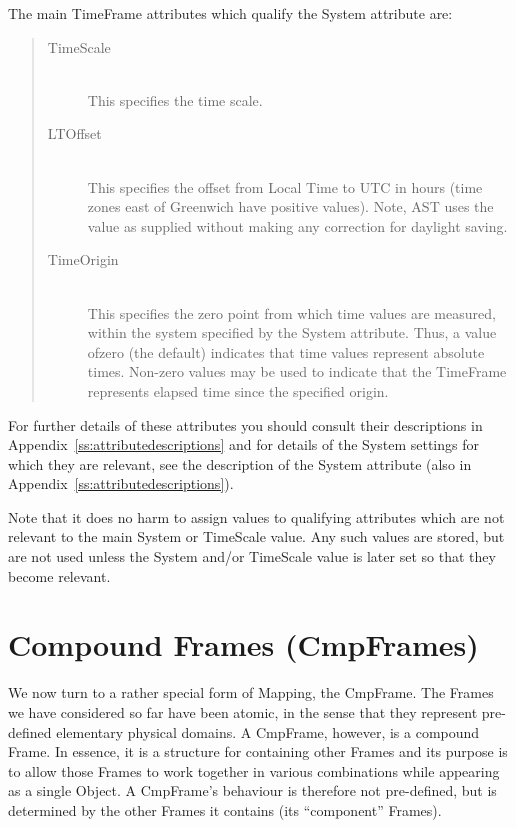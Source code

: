 \documentclass[twoside,11pt]{article}
\newcommand{\appref}[1]{Appendix~\ref{#1}}
\newcommand{\appref}[1]{\ref{#1}}
\begin{document}
The main TimeFrame attributes which qualify the System attribute are:

\begin{quote}
\begin{description}

\item[TimeScale]\mbox{}\\
This specifies the time scale.

\item[LTOffset]\mbox{}\\
This specifies the offset from Local Time to UTC in hours (time zones
east of Greenwich have positive values). Note, AST uses the value as
supplied without making any correction for daylight saving.

\item[TimeOrigin]\mbox{}\\
This specifies the zero point from which time values are measured, within
the system specified by the System attribute. Thus, a value ofzero (the
default) indicates that time values represent absolute times. Non-zero
values may be used to indicate that the TimeFrame represents elapsed time
since the specified origin.

\end{description}
\end{quote}

For further details of these attributes you should consult their
descriptions in \appref{ss:attributedescriptions} and for details of
the System settings for which they are relevant, see the description
of the System attribute (also in \appref{ss:attributedescriptions}).

Note that it does no harm to assign values to qualifying attributes
which are not relevant to the main System or TimeScale value. Any such
values are stored, but are not used unless the System and/or TimeScale
value is later set so that they become relevant.

\cleardoublepage
\section{\label{ss:cmpframes}Compound Frames (CmpFrames)}

We now turn to a rather special form of Mapping, the CmpFrame. The
Frames we have considered so far have been atomic, in the sense that
they represent pre-defined elementary physical domains. A CmpFrame,
however, is a compound Frame. In essence, it is a structure for
containing other Frames and its purpose is to allow those Frames
to work together in various combinations while appearing as a single
Object. A CmpFrame's behaviour is therefore not pre-defined, but is
determined by the other Frames it contains (its ``component'' Frames).
\end{document}
